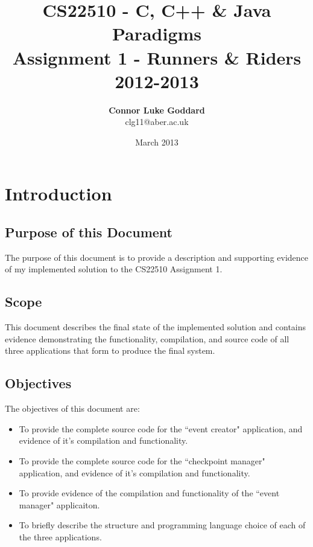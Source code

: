 \documentclass[a4paper, 10pt]{article}
\title{\textbf{CS22510 - C, C++ \& Java Paradigms} \\ Assignment 1 - Runners \& Riders \\ 2012-2013}
\author{\textbf{Connor Luke Goddard}\\clg11@aber.ac.uk}
\date{March 2013}
\begin{document}
\begin{titlepage}
\maketitle
\thispagestyle{empty}
\end{titlepage}

\tableofcontents
\clearpage

\section{Introduction}

\subsection{Purpose of this Document}
The purpose of this document is to provide a description and supporting evidence of my implemented solution to the CS22510 Assignment 1. 

\subsection{Scope}
This document describes the final state of the implemented solution and contains  evidence demonstrating the functionality, compilation, and source code of all three applications that form to produce the final system.

\subsection{Objectives}

The objectives of this document are:

\begin{itemize}

\item To provide the complete source code for the ``event creator" application, and evidence of it's compilation and functionality.
\item To provide the complete source code for the ``checkpoint manager" application, and evidence of it's compilation and functionality.
\item To provide evidence of the compilation and functionality of the ``event manager" applicaiton.
\item To briefly describe the structure and programming language choice of each of the three applications.

\end{itemize}
\end{document}

